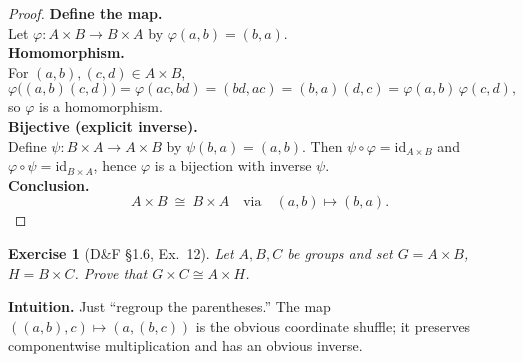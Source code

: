\documentclass[12pt]{article}
\newtheorem{exercise}[theorem]{Exercise}
\theoremstyle{definition}
\begin{document}
\dotfill

\begin{proof}
\noindent\textbf{Define the map.}\\
\noindent Let $\varphi:A\times B\to B\times A$ by $\varphi(a,b)=(b,a)$.\\

\noindent\textbf{Homomorphism.}\\
\noindent For $(a,b),(c,d)\in A\times B$,
\[
\varphi\big((a,b)(c,d)\big)=\varphi(ac,bd)=(bd,ac)=(b,a)(d,c)=\varphi(a,b)\,\varphi(c,d),
\]
so $\varphi$ is a homomorphism.\\

\noindent\textbf{Bijective (explicit inverse).}\\
\noindent Define $\psi:B\times A\to A\times B$ by $\psi(b,a)=(a,b)$. Then $\psi\circ\varphi=\mathrm{id}_{A\times B}$ and $\varphi\circ\psi=\mathrm{id}_{B\times A}$, hence $\varphi$ is a bijection with inverse $\psi$.\\

\noindent\textbf{Conclusion.}
\[
\boxed{\,A\times B\ \cong\ B\times A\quad\text{via}\quad(a,b)\mapsto(b,a).\,}
\]
\end{proof}

\newpage

\begin{exercise}[D\&F §1.6, Ex.~12]
Let $A,B,C$ be groups and set $G=A\times B$, $H=B\times C$. Prove that $G\times C \cong A\times H$.
\end{exercise}

\dotfill

\noindent\textbf{Intuition.}
Just “regroup the parentheses.” The map $((a,b),c)\mapsto (a,(b,c))$ is the obvious coordinate shuffle; it preserves componentwise multiplication and has an obvious inverse.\\

\dotfill
\end{document}
